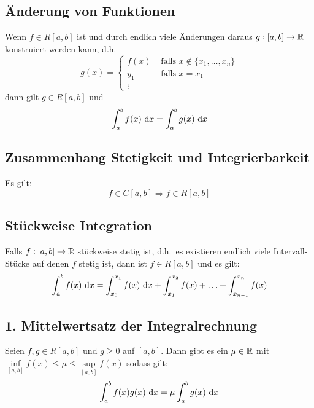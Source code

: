 \subsection{Änderung von Funktionen}
Wenn $f \in R[a, b]$ ist und durch endlich viele Änderungen daraus
$g: [a,b] \rightarrow \mathbb{R}$ konstruiert werden kann, d.h.
\begin{equation*}
    g(x) =
    \begin{cases}
        f(x) &\text{ falls } x \notin \{x_1, \ldots, x_n \} \\
        y_1 &\text{ falls } x=x_1\\
        \vdots
    \end{cases}
\end{equation*}
dann gilt $g \in R[a, b]$ und
\begin{equation*}
    \int_a^b f(x) \text{ d}x = \int_a^b g(x) \text{ d}x
\end{equation*}

\subsection{Zusammenhang Stetigkeit und Integrierbarkeit}
Es gilt:
\begin{equation*}
    f \in C[a, b] \Rightarrow f \in R[a, b]
\end{equation*}

\subsection{Stückweise Integration}
Falls $f: [a, b] \rightarrow \mathbb{R}$ stückweise stetig ist, d.h.\ es existieren
endlich viele Intervall-Stücke auf denen $f$ stetig ist, dann ist
$f \in R[a,b]$ und es gilt:
\begin{equation*}
    \int_a^b f(x) \text{ d}x = \int_{x_0}^{x_1} f(x) \text{ d}x + \int_{x_1}^{x_2} f(x)
    + \ldots + \int_{x_{n-1}}^{x_n} f(x)
\end{equation*}

\subsection{1. Mittelwertsatz der Integralrechnung}
Seien $f, g \in R[a,b]$ und $g \geq 0$ auf $[a, b]$. Dann gibt es ein $\mu \in \mathbb{R}$
mit $\inf\limits_{[a,b]} f(x) \leq \mu \leq \sup\limits_{[a,b]} f(x)$ sodass gilt:
\begin{equation*}
    \int_a^b f(x)g(x)\text{ d}x = \mu \int_a^b g(x) \text{ d}x
\end{equation*}

